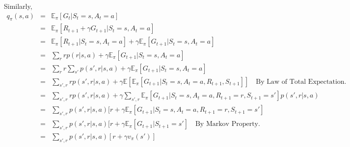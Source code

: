 \begin{appendices}
Similarly,
\begin{eqnarray*}
q_\pi(s,a) &=& \mathbb{E}_\pi[G_t|S_t=s,A_t=a]\\
&=&\mathbb{E}_\pi[R_{t+1} + \gamma G_{t+1}|S_t=s,A_t=a]\\
&=&\mathbb{E}_\pi[R_{t+1}|S_t=s,A_t=a] + \gamma\mathbb{E}_\pi[G_{t+1}|S_t=s,A_t=a]\\
&=&\sum_r rp(r|s,a) + \gamma\mathbb{E}_\pi[G_{t+1}|S_t=s,A_t=a]\\
&=&\sum_r r\sum_{s'}p(s',r|s,a) + \gamma\mathbb{E}_\pi[G_{t+1}|S_t=s,A_t=a]\\
&=&\sum_{s',r}rp(s',r|s,a) + \gamma\mathbb{E}[\mathbb{E}_\pi[G_{t+1}|S_t=s,A_t=a,R_{t+1},S_{t+1}]] \quad \text{By Law of Total Expectation.}\\
&=&\sum_{s',r} rp(s',r|s,a) + \gamma\sum_{s',r}\mathbb{E}_\pi[G_{t+1}|S_t=s,A_t=a,R_{t+1}=r,S_{t+1}=s']p(s',r|s,a)\\
&=&\sum_{s',r} p(s',r|s,a)[r + \gamma\mathbb{E}_\pi[G_{t+1}|S_t=s,A_t=a,R_{t+1}=r,S_{t+1}=s']\\
	&=&\sum_{s',r} p(s',r|s,a)[r + \gamma\mathbb{E}_\pi[G_{t+1}|S_{t+1}=s'] \quad \text{By Markov Property.}\\
&=&\sum_{s',r} p(s',r|s,a)[r + \gamma v_\pi(s')]\\
\end{eqnarray*}



\end{appendices}
